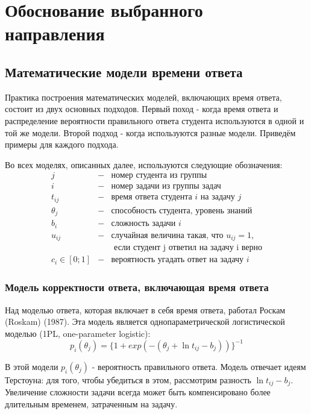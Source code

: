 \chapter{Обоснование выбранного направления}
\label{ch22}
\section{Математические модели времени ответа}

Практика построения математических моделей, включающих время ответа, состоит из двух основных подходов. Первый поход - когда время ответа и распределение вероятности правильного ответа студента используются в одной и той же модели. Второй подход - когда используются разные модели. Приведём примеры для каждого подхода.

Во всех моделях, описанных далее, используются следующие обозначения:
$$
\begin{array}{lll}
j &-& \mbox{номер студента из группы}\\
i &-& \mbox{номер задачи из группы задач}\\
t_{ij} &-& \mbox{время ответа студента } i \mbox{ на задачу } j\\
\theta_j &-& \mbox{способность студента, уровень знаний}\\
b_i &-& \mbox{сложность задачи } i\\
u_{ij} &-& \mbox{случайная величина такая, что } u_{ij} = 1, \\  
& &\mbox{ если студент  j  ответил на задачу i верно} \\
c_i \in [0;1] &-& \mbox{вероятность угадать ответ на задачу } i
\end{array}
$$

\subsection{Модель корректности ответа, включающая время ответа}

Над моделью ответа, которая включает в себя время ответа, работал Роскам (Roskam) (1987). Эта модель является однопараметрической логистической моделью (1PL, one-para\-meter logistic):
\begin{equation}
p_i(\theta_j) = \{1+exp(-(\theta_j + \ln t_{ij} - b_j))\}^{-1}
\end{equation}

В этой модели $p_i(\theta_j)$ - вероятность правильного ответа. Модель отвечает идеям Терсто\-уна: для того, чтобы убедиться в этом, рассмотрим разность $\ln t_{ij} - b_j$. Увеличение сложнос\-ти задачи всегда может быть компенсировано более длительным временем, затра\-ченным на задачу.

